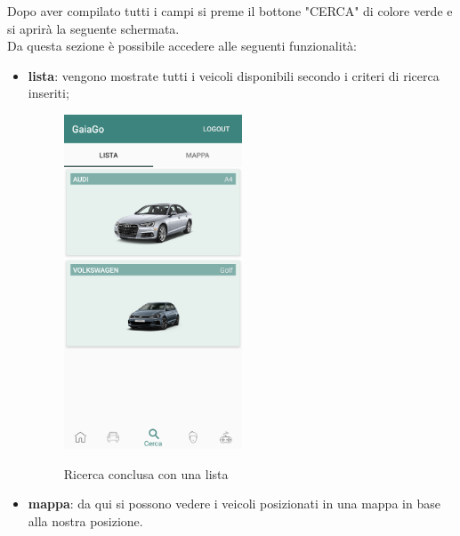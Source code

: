 Dopo aver compilato tutti i campi si preme il bottone "CERCA" di colore verde e si aprirà la seguente schermata.\\
Da questa sezione è possibile accedere alle seguenti funzionalità:
\begin{itemize}
	\item \textbf{lista}: vengono mostrate tutti i veicoli disponibili secondo i criteri di ricerca inseriti;
	\begin{figure}[H] 
		\centering 
		\includegraphics[width=0.5\textwidth]{res/images/ricerca_conclusa.png}\\
		\caption{Ricerca conclusa con una lista}
		\label{lista}
	\end{figure}
	\pagebreak
	\item \textbf{mappa}: da qui si possono vedere i veicoli posizionati in una mappa in base alla nostra posizione.
	\begin{figure}[H] 
		\centering 

\end{figure}
\end{itemize}
